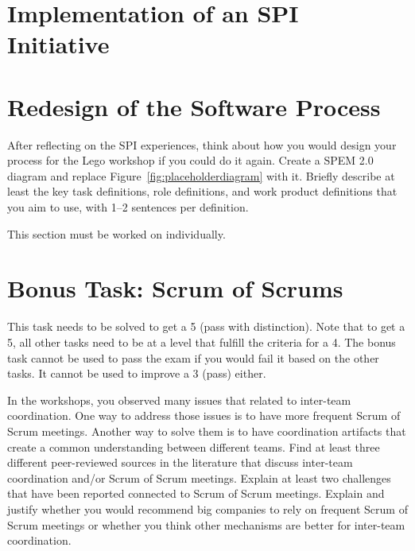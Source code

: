 \documentclass[conference]{IEEEtran}
\begin{document}
\section{Implementation of an SPI Initiative}
\label{sec:implementation}


\section{Redesign of the Software Process}
\label{sec:redesign}

After reflecting on the SPI experiences, think about how you would design your process for the Lego workshop if you could do it again.
Create a SPEM 2.0 diagram and replace Figure~\ref{fig:placeholderdiagram} with it.
Briefly describe at least the key task definitions, role definitions, and work product definitions that you aim to use, with 1--2 sentences per definition.

This section must be worked on individually.

\section{Bonus Task: Scrum of Scrums}
\label{sec:bonus_task}

This task needs to be solved to get a 5 (pass with distinction).
Note that to get a 5, all other tasks need to be at a level that fulfill the criteria for a 4.
The bonus task cannot be used to pass the exam if you would fail it based on the other tasks.
It cannot be used to improve a 3 (pass) either.

In the workshops, you observed many issues that related to inter-team coordination. One way to address those issues is to have more frequent Scrum of Scrum meetings. Another way to solve them is to have coordination artifacts that create a common understanding between different teams. Find at least three different peer-reviewed sources in the literature that discuss inter-team coordination and/or Scrum of Scrum meetings. Explain at least two challenges that have been reported connected to Scrum of Scrum meetings. Explain and justify whether you would recommend big companies to rely on frequent Scrum of Scrum meetings or whether you think other mechanisms are better for inter-team coordination. 
\end{document}

